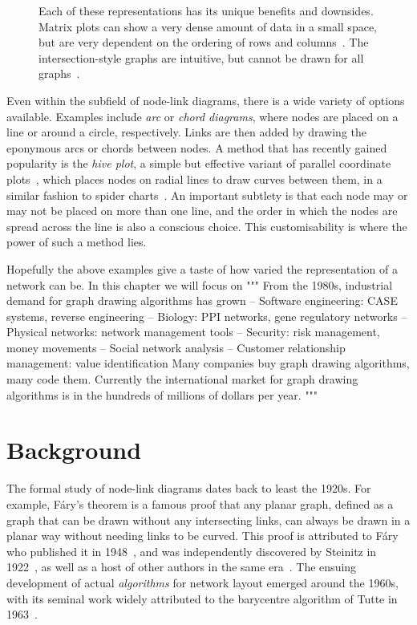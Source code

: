 \begin{figure}
\caption{Each of these representations has its unique benefits and downsides. Matrix plots can show a very dense amount of data in a small space, but are very dependent on the ordering of rows and columns~\cite{TODO}.
The intersection-style graphs are intuitive, but cannot be drawn for all graphs~\cite{TODO}.}

\label{fig:graphrepresentations}
\end{figure}

Even within the subfield of node-link diagrams, there is a wide variety of options available.
Examples include \emph{arc} or \emph{chord diagrams}, where nodes are placed on a line or around a circle, respectively. Links are then added by drawing the eponymous arcs or chords between nodes.
A method that has recently gained popularity is the \emph{hive plot}, a simple but effective variant of parallel coordinate plots~\cite{TODO}, which places nodes on radial lines to draw curves between them, in a similar fashion to spider charts~\cite{TODO}. An important subtlety is that each node may or may not be placed on more than one line, and the order in which the nodes are spread across the line is also a conscious choice. This customisability is where the power of such a method lies.

Hopefully the above examples give a taste of how varied the representation of a network can be. In this chapter we will focus on 
"""
 From the 1980s, industrial demand for graph drawing algorithms has grown
– Software engineering: CASE systems, reverse engineering – Biology: PPI networks, gene regulatory networks
– Physical networks: network management tools
– Security: risk management, money movements
– Social network analysis
– Customer relationship management: value identification Many companies buy graph drawing algorithms, many code them.
Currently the international market for graph drawing algorithms is in the hundreds of millions of dollars per year.
"""

\section{Background}
The formal study of node-link diagrams dates back to least the 1920s. For example, F\'ary's theorem is a famous proof that any planar graph, defined as a graph that can be drawn without any intersecting links, can always be drawn in a planar way without needing links to be curved. This proof is attributed to F\'ary who published it in 1948~\cite{TODO}, and was independently discovered by Steinitz in 1922~\cite{TODO}, as well as a host of other authors in the same era~\cite{wagner1936, koebe1936, stein1951}.
The ensuing development of actual \emph{algorithms} for network layout emerged around the 1960s, with its seminal work widely attributed to the barycentre algorithm of Tutte in 1963~\cite{TODO}. 


